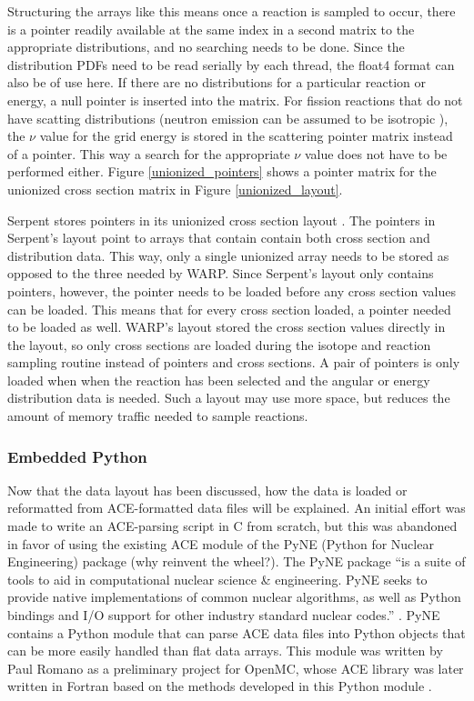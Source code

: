 Structuring the arrays like this means once a reaction is sampled to occur, there is a pointer readily available at the same index in a second matrix to the appropriate distributions, and no searching needs to be done.  Since the distribution PDFs need to be read serially by each thread, the float4 format can also be of use here.  If there are no distributions for a particular reaction or energy, a null pointer is inserted into the matrix.  For fission reactions that do not have scatting distributions (neutron emission can be assumed to be isotropic \cite{openmc}), the $\nu$ value for the grid energy is stored in the scattering pointer matrix instead of a pointer.  This way a search for the appropriate $\nu$ value does not have to be performed either.  Figure \ref{unionized_pointers} shows a pointer matrix for the unionized cross section matrix in Figure \ref{unionized_layout}.

Serpent stores pointers in its unionized cross section layout \cite{jaakko}.  The pointers in Serpent's layout point to arrays that contain contain both cross section and distribution data.  This way, only a single unionized array needs to be stored as opposed to the three needed by WARP.  Since Serpent's layout only contains pointers, however, the pointer needs to be loaded before any cross section values can be loaded.  This means that for every cross section loaded, a pointer needed to be loaded as well.  WARP's layout stored the cross section values directly in the layout, so only cross sections are loaded during the isotope and reaction sampling routine instead of pointers and cross sections.  A pair of pointers is only loaded when when the reaction has been selected and the angular or energy distribution data is needed.  Such a layout may use more space, but reduces the amount of memory traffic needed to sample reactions.

\subsubsection{Embedded Python}

Now that the data layout has been discussed, how the data is loaded or reformatted from ACE-formatted data files will be explained.  An initial effort was made to write an ACE-parsing script in C from scratch, but this was abandoned in favor of using the existing ACE module of the PyNE (Python for Nuclear Engineering) package \cite{pyne} (why reinvent the wheel?).  The PyNE package ``is a suite of tools to aid in computational nuclear science \& engineering. PyNE seeks to provide native implementations of common nuclear algorithms, as well as Python bindings and I/O support for other industry standard nuclear codes.'' \cite{pyne}.  PyNE contains a Python module that can parse ACE data files into Python objects that can be more easily handled than flat data arrays.  This module was written by Paul Romano as a preliminary project for OpenMC, whose ACE library was later written in Fortran based on the methods developed in this Python module \cite{pyne,openmc}.  

